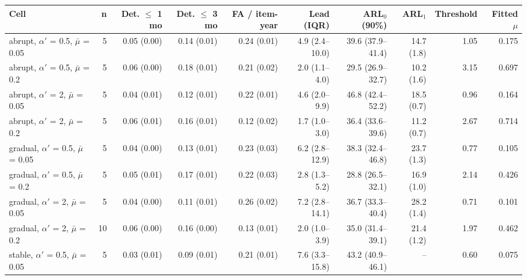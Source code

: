 \documentclass[10pt,a4paper]{article}
\begin{document}
\noindent\begin{minipage}{\linewidth}
\label{tab:S9}
\centering\scriptsize
\begin{tabular}{lrrrrrrrrr}
\toprule
Cell & n & Det. $\le$ 1 mo & Det. $\le$ 3 mo & FA / item-year & Lead (IQR) & ARL$_0$ (90\%) & ARL$_1$ & Threshold & Fitted $\mu$ \\ \midrule
abrupt, $\alpha'$ = 0.5, $\bar{\mu}$ = 0.05 & 5 & 0.05 (0.00) & 0.14 (0.01) & 0.24 (0.01) & 4.9 (2.4–10.0) & 39.6 (37.9–41.4) & 14.7 (1.8) & 1.05 & 0.175 \\
abrupt, $\alpha'$ = 0.5, $\bar{\mu}$ = 0.2 & 5 & 0.06 (0.00) & 0.18 (0.01) & 0.21 (0.02) & 2.0 (1.1–4.0) & 29.5 (26.9–32.7) & 10.2 (1.6) & 3.15 & 0.697 \\
abrupt, $\alpha'$ = 2, $\bar{\mu}$ = 0.05 & 5 & 0.04 (0.01) & 0.12 (0.01) & 0.22 (0.01) & 4.6 (2.0–9.9) & 46.8 (42.4–52.2) & 18.5 (0.7) & 0.96 & 0.164 \\
abrupt, $\alpha'$ = 2, $\bar{\mu}$ = 0.2 & 5 & 0.06 (0.01) & 0.16 (0.01) & 0.12 (0.02) & 1.7 (1.0–3.0) & 36.4 (33.6–39.6) & 11.2 (0.7) & 2.67 & 0.714 \\
gradual, $\alpha'$ = 0.5, $\bar{\mu}$ = 0.05 & 5 & 0.04 (0.00) & 0.13 (0.01) & 0.23 (0.03) & 6.2 (2.8–12.9) & 38.3 (32.4–46.8) & 23.7 (1.3) & 0.77 & 0.105 \\
gradual, $\alpha'$ = 0.5, $\bar{\mu}$ = 0.2 & 5 & 0.05 (0.01) & 0.17 (0.01) & 0.22 (0.03) & 2.8 (1.3–5.2) & 28.8 (26.5–32.1) & 16.9 (1.0) & 2.14 & 0.426 \\
gradual, $\alpha'$ = 2, $\bar{\mu}$ = 0.05 & 5 & 0.04 (0.00) & 0.11 (0.01) & 0.26 (0.02) & 7.2 (2.8–14.1) & 36.7 (33.3–40.4) & 28.2 (1.4) & 0.71 & 0.101 \\
gradual, $\alpha'$ = 2, $\bar{\mu}$ = 0.2 & 10 & 0.06 (0.00) & 0.16 (0.00) & 0.13 (0.01) & 2.0 (1.0–3.9) & 35.0 (31.4–39.1) & 21.4 (1.2) & 1.97 & 0.462 \\
stable, $\alpha'$ = 0.5, $\bar{\mu}$ = 0.05 & 5 & 0.03 (0.01) & 0.09 (0.01) & 0.21 (0.01) & 7.6 (3.3–15.8) & 43.2 (40.9–46.1) & – & 0.60 & 0.075 \\

\end{tabular}
\end{minipage}
\end{document}
